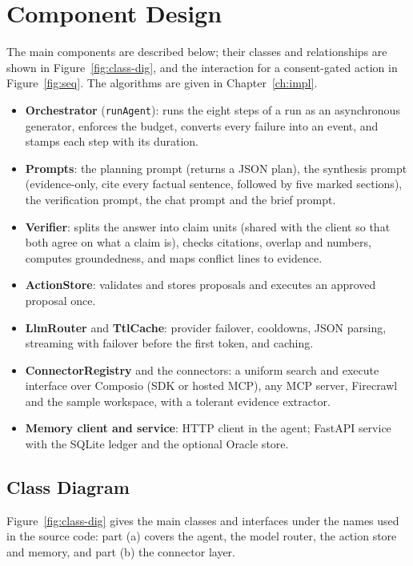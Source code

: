 \documentclass[oneside,a4paper,12pt]{report}
\begin{document}
\section{Component Design}
The main components are described below; their classes and relationships are shown in Figure~\ref{fig:class-dig}, and the interaction for a consent-gated action in Figure~\ref{fig:seq}. The algorithms are given in Chapter~\ref{ch:impl}.
\begin{itemize}
\item \textbf{Orchestrator} (\texttt{runAgent}): runs the eight steps of a run as an asynchronous generator, enforces the budget, converts every failure into an event, and stamps each step with its duration.
\item \textbf{Prompts}: the planning prompt (returns a JSON plan), the synthesis prompt (evidence-only, cite every factual sentence, followed by five marked sections), the verification prompt, the chat prompt and the brief prompt.
\item \textbf{Verifier}: splits the answer into claim units (shared with the client so that both agree on what a claim is), checks citations, overlap and numbers, computes groundedness, and maps conflict lines to evidence.
\item \textbf{ActionStore}: validates and stores proposals and executes an approved proposal once.
\item \textbf{LlmRouter} and \textbf{TtlCache}: provider failover, cooldowns, JSON parsing, streaming with failover before the first token, and caching.
\item \textbf{ConnectorRegistry} and the connectors: a uniform search and execute interface over Composio (SDK or hosted MCP), any MCP server, Firecrawl and the sample workspace, with a tolerant evidence extractor.
\item \textbf{Memory client and service}: HTTP client in the agent; FastAPI service with the SQLite ledger and the optional Oracle store.
\end{itemize}
\subsection{Class Diagram}
Figure~\ref{fig:class-dig} gives the main classes and interfaces under the names used in the source code: part (a) covers the agent, the model router, the action store and memory, and part (b) the connector layer.
\end{document}
